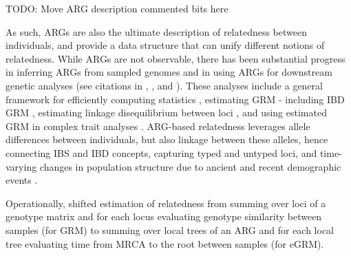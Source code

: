 \begin{tcolorbox}[breakable,pad at break*=1mm, colback=blue!5!white,colframe=blue!75!black,title=Box 1: A Brief History of Genetic Relatedness]
TODO: Move ARG description commented bits here

%
As such, ARGs are also the ultimate description of relatedness between individuals,
and provide a data structure that can unify different notions of relatedness.
%
While ARGs are not observable, there has been substantial progress in inferring ARGs
from sampled genomes \citep{speidel2019method, kelleher2019inferring, zhang2023biobank, deng2024robust}
and in using ARGs for downstream genetic analyses (see citations in
\cite{lewanski2024era}, \cite{brandt2024promise}, and \cite{wong2023general}).
%
These analyses include a general framework for efficiently computing statistics \citep{ralph2020efficiently},
estimating GRM \citep{fan2022genealogical, zhang2023biobank} -
including IBD GRM \citep{tsambos2022efficient},
estimating linkage disequilibrium between loci \citep{nowbandegani2023extremely}, and
using estimated GRM in complex trait analyses \citep{zhang2023biobank, link2023tree, schraiber2024unifying}.
%
ARG-based relatedness leverages allele differences between individuals,
but also linkage between these alleles, hence
connecting IBS and IBD concepts,
capturing typed and untyped loci, and
time-varying changes in population structure due to ancient and recent demographic events
\citep{fan2022genealogical, young2022discovering, zhang2023biobank, harris2023using}.

%
%
%
Operationally, \cite{fan2022genealogical} shifted estimation of relatedness from summing over loci of a genotype matrix and for each locus evaluating genotype similarity between samples (for GRM) to summing over local trees of an ARG and for each local tree evaluating time from MRCA to the root between samples (for eGRM).
%

%


\end{tcolorbox}
